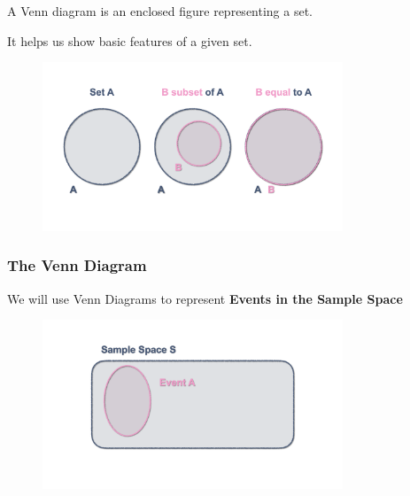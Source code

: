 \documentclass[notes=show]{beamer}\usepackage[]{graphicx}\usepackage[]{color}
\begin{document}
\begin{frame}{\secname}
A Venn diagram is an enclosed figure representing a set.

It helps us show basic features of a given set.
\begin{figure}[h!]
\centering
\includegraphics[width=0.8\textwidth,height=0.6\textheight]{img/charts/charts.001.png}
\end{figure}

\end{frame}

\begin{frame}
\frametitle{The Venn Diagram}

We will use Venn Diagrams to represent \textbf{Events in the Sample Space}

\begin{figure}[h!]
\centering
\includegraphics[width=0.8\textwidth,height=0.6\textheight]{img/charts/charts.002.png}
\end{figure}
\end{frame}
\end{document}
